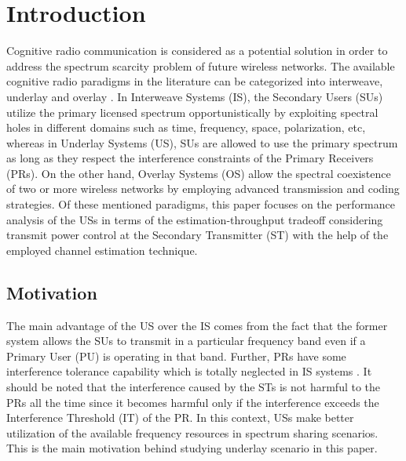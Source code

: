 \documentclass[conference, twocolumn]{IEEEtran}
\begin{document}
\section{Introduction}%
Cognitive radio communication is considered as a potential solution in order to address the spectrum scarcity problem of future wireless networks. The available cognitive radio paradigms in the 
literature can be categorized into interweave, underlay and overlay \cite{Goldsmith09}. In Interweave Systems (IS), the Secondary Users (SUs) utilize the primary licensed spectrum opportunistically by exploiting spectral holes in different domains such as time, frequency, space, polarization, etc, whereas in Underlay Systems (US), SUs are allowed to use the primary spectrum as long as they respect the interference constraints of the Primary Receivers (PRs). On the other hand, Overlay Systems (OS) allow the spectral coexistence of two or more wireless networks by employing advanced transmission and coding strategies. Of these mentioned paradigms, this paper focuses on the performance analysis of the USs in terms of the estimation-throughput tradeoff considering transmit power control at the Secondary Transmitter (ST) with the help of the employed channel estimation technique.


\subsection{Motivation}
The main advantage of the US over the IS comes from the fact that the former system allows the SUs to transmit in a particular frequency band even if a Primary User (PU) is operating in that band. Further, PRs have some interference tolerance capability which is totally neglected in IS systems \cite{Jiang13, Sharma14}. It should be noted that the interference caused by the STs is not harmful to the PRs all the time since it becomes harmful only if the interference exceeds the Interference Threshold (IT) of the PR. In this context, USs make better utilization of the available frequency resources in spectrum sharing scenarios. This is the main motivation behind studying underlay scenario in this paper.
\end{document}
